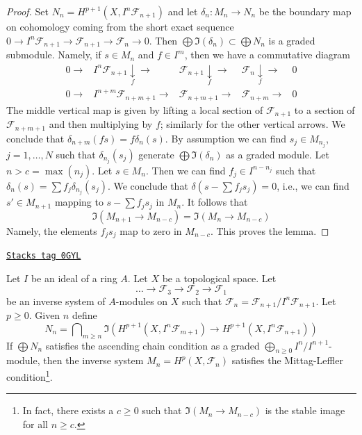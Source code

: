 \begin{proof}
Set $N_n = H^{p + 1}(X, I^n\mathcal{F}_{n + 1})$ and let
$\delta_n : M_n \to N_n$ be the boundary map on cohomology
coming from the short exact sequence
$0 \to I^n\mathcal{F}_{n + 1} \to \mathcal{F}_{n + 1} \to \mathcal{F}_n \to 0$.
Then $\bigoplus \Im(\delta_n) \subset \bigoplus N_n$ is a graded submodule.
Namely, if $s \in M_n$ and $f \in I^m$, then we have a commutative diagram
$$
\begin{array}{ccccc}0 \longrightarrow & I^n\mathcal{F}_{n + 1} \underset{f}{\downarrow}\longrightarrow & \mathcal{F}_{n + 1} \underset{f}{\downarrow}\longrightarrow & \mathcal{F}_n \underset{f}{\downarrow}\longrightarrow & 0 \\ 0 \longrightarrow & I^{n + m}\mathcal{F}_{n + m + 1} \longrightarrow & \mathcal{F}_{n + m + 1} \longrightarrow & \mathcal{F}_{n + m} \longrightarrow & 0\end{array}
$$
The middle vertical map is given by lifting a local section of
$\mathcal{F}_{n + 1}$ to a section of $\mathcal{F}_{n + m + 1}$
and then multiplying by $f$; similarly for the other vertical arrows.
We conclude that $\delta_{n + m}(fs) = f \delta_n(s)$.
By assumption we can find $s_j \in M_{n_j}$, $j = 1, \ldots, N$
such that $\delta_{n_j}(s_j)$
generate $\bigoplus \Im(\delta_n)$ as a graded module. Let $n > c = \max(n_j)$.
Let $s \in M_n$. Then we can find $f_j \in I^{n - n_j}$ such that
$\delta_n(s) = \sum f_j \delta_{n_j}(s_j)$. We conclude that
$\delta(s - \sum f_j s_j) = 0$, i.e., we can find $s' \in M_{n + 1}$
mapping to $s - \sum f_js_j$ in $M_n$. It follows that
$$
\Im(M_{n + 1} \to M_{n - c}) = \Im(M_n \to M_{n - c})
$$
Namely, the elements $f_js_j$ map to zero in $M_{n - c}$.
This proves the lemma.
\end{proof}

\begin{lemma}
\label{cohomology-lemma-ML-general-better}
\href{https://stacks.math.columbia.edu/tag/0GYL}{\texttt{Stacks tag 0GYL}}

Let $I$ be an ideal of a ring $A$. Let $X$ be a topological space. Let
$$
\ldots \to \mathcal{F}_3 \to \mathcal{F}_2 \to \mathcal{F}_1
$$
be an inverse system of $A$-modules on $X$
such that $\mathcal{F}_n = \mathcal{F}_{n + 1}/I^n\mathcal{F}_{n + 1}$.
Let $p \geq 0$. Given $n$ define
$$
N_n =
\bigcap\nolimits_{m \geq n}
\Im\left(
H^{p + 1}(X, I^n\mathcal{F}_{m + 1}) \to H^{p + 1}(X, I^n\mathcal{F}_{n + 1})
\right)
$$
If $\bigoplus N_n$ satisfies the ascending chain condition as a graded
$\bigoplus_{n \geq 0} I^n/I^{n + 1}$-module, then the inverse system
$M_n = H^p(X, \mathcal{F}_n)$ satisfies the Mittag-Leffler
condition\footnote{In fact, there exists
a $c \geq 0$ such that $\Im(M_n \to M_{n - c})$ is the stable image
for all $n \geq c$.}.
\end{lemma}

